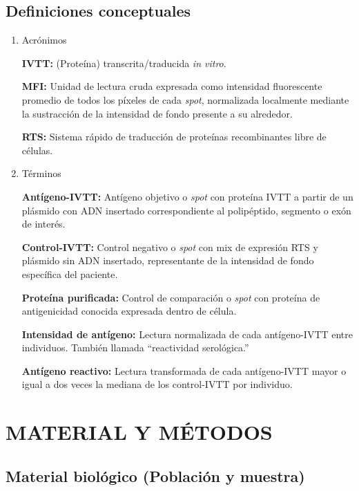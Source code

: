 \documentclass[
  a4paper]{article}
\begin{document}
\hypertarget{definiciones-conceptuales}{%
\subsection{Definiciones conceptuales}\label{definiciones-conceptuales}}

\begin{enumerate}
\def\labelenumi{\alph{enumi}.}
\item
  Acrónimos

  \textbf{IVTT:} (Proteína) transcrita/traducida \emph{in vitro}.

  \textbf{MFI:} Unidad de lectura cruda expresada como intensidad
  fluorescente promedio de todos los píxeles de cada \emph{spot},
  normalizada localmente mediante la sustracción de la intensidad de
  fondo presente a su alrededor.

  \textbf{RTS:} Sistema rápido de traducción de proteínas recombinantes
  libre de células.
\item
  Términos

  \textbf{Antígeno-IVTT:} Antígeno objetivo o \emph{spot} con proteína
  IVTT a partir de un plásmido con ADN insertado correspondiente al
  polipéptido, segmento o exón de interés.

  \textbf{Control-IVTT:} Control negativo o \emph{spot} con mix de
  expresión RTS y plásmido sin ADN insertado, representante de la
  intensidad de fondo específica del paciente.

  \textbf{Proteína purificada:} Control de comparación o \emph{spot} con
  proteína de antigenicidad conocida expresada dentro de célula.

  \textbf{Intensidad de antígeno:} Lectura normalizada de cada
  antígeno-IVTT entre individuos. También llamada ``reactividad
  serológica.''

  \textbf{Antígeno reactivo:} Lectura transformada de cada antígeno-IVTT
  mayor o igual a dos veces la mediana de los control-IVTT por
  individuo.
\end{enumerate}

\hypertarget{meto}{%
\section{MATERIAL Y MÉTODOS}\label{meto}}

\hypertarget{material-bioluxf3gico-poblaciuxf3n-y-muestra}{%
\subsection{Material biológico (Población y
muestra)}\label{material-bioluxf3gico-poblaciuxf3n-y-muestra}}
\end{document}
